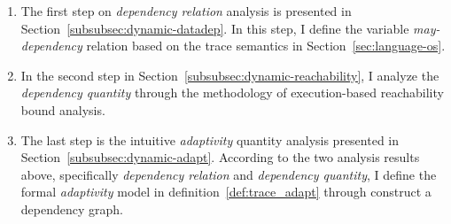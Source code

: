  \begin{enumerate}
 \item The first step on \emph{dependency relation} analysis is presented in Section~\ref{subsubsec:dynamic-datadep}.
 In this step, I define the variable \emph{may-dependency} relation based on the trace semantics in Section~\ref{sec:language-os}.
 \item In the second step in Section~\ref{subsubsec:dynamic-reachability}, I analyze the \emph{dependency quantity} through the methodology of execution-based reachability bound analysis.
 \item The last step is the intuitive \emph{adaptivity} quantity analysis presented in Section~\ref{subsubsec:dynamic-adapt}.
 According to the two analysis results above, specifically \emph{dependency relation} and \emph{dependency quantity},
 I define the formal \emph{adaptivity} model in definition~\ref{def:trace_adapt} through 
 construct a dependency graph.
 \end{enumerate}


